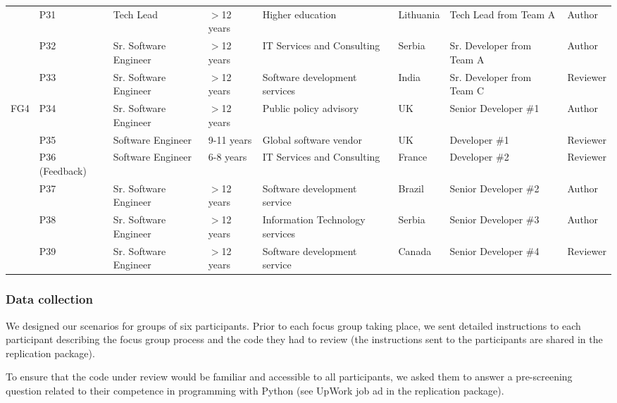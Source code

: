 {\begin{landscape}
\begin{longtable}{clp{2.5cm}lllp{3.1cm}l}
                              & P31 & Tech Lead & $>$12 years & Higher education & Lithuania & Tech Lead from Team A & Author\\ 
                              & P32 & Sr. Software Engineer & $>$12 years & IT Services and Consulting & Serbia & Sr. Developer from Team A & Author\\ 
                              & P33 & Sr. Software Engineer & $>$12 years & Software development services & India & Sr. Developer from Team C & Reviewer\\ \hline
         \multirow{6}{*}{FG4} & P34 & Sr. Software Engineer & $>$12 years & Public policy advisory & UK & Senior Developer \#1 & Author\\ 
                              & P35 & Software Engineer & 9-11 years & Global software vendor & UK & Developer \#1 & Reviewer\\ 
                              & P36 (Feedback)& Software Engineer & 6-8 years & IT Services and Consulting & France & Developer \#2 & Reviewer\\ 
                              & P37 & Sr. Software Engineer & $>$12 years & Software development service & Brazil & Senior Developer \#2 & Author\\ 
                              & P38 & Sr. Software Engineer & $>$12 years & Information Technology services & Serbia & Senior Developer \#3 & Author\\ 
                              & P39 & Sr. Software Engineer & $>$12 years & Software development service & Canada & Senior Developer \#4 & Reviewer\\ 
                              \bottomrule
       

    \end{longtable}

\end{landscape}

}


\subsubsection{Data collection} We designed our scenarios for groups of six participants. Prior to each focus group taking place, we sent detailed instructions to each participant describing the focus group process and the code they had to review (the instructions sent to the participants are shared in the replication package). 

To ensure that the code under review would be familiar and accessible to all participants, we asked them to answer a pre-screening question related to their competence in programming with Python (see UpWork job ad in the replication package).

